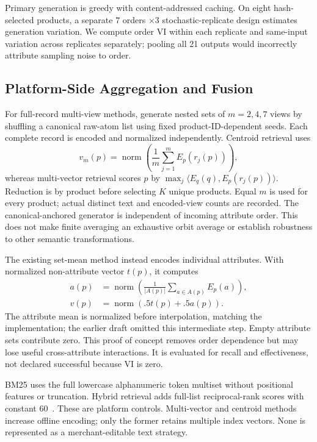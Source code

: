 Primary generation is greedy with content-addressed caching. On eight hash-selected products, a separate $7$ orders $\times 3$ stochastic-replicate design estimates generation variation. We compute order VI within each replicate and same-input variation across replicates separately; pooling all 21 outputs would incorrectly attribute sampling noise to order.

\subsection{Platform-Side Aggregation and Fusion}
For full-record multi-view methods, generate nested sets of $m=2,4,7$ views by shuffling a canonical raw-atom list using fixed product-ID-dependent seeds. Each complete record is encoded and normalized independently. Centroid retrieval uses
\begin{equation}
v_m(p)=\operatorname{norm}\left(\frac1m\sum_{j=1}^{m}E_p(r_j(p))\right),
\end{equation}
whereas multi-vector retrieval scores $p$ by $\max_j\langle E_q(q),E_p(r_j(p))\rangle$. Reduction is by product before selecting $K$ unique products. Equal $m$ is used for every product; actual distinct text and encoded-view counts are recorded. The canonical-anchored generator is independent of incoming attribute order. This does not make finite averaging an exhaustive orbit average or establish robustness to other semantic transformations.

The existing set-mean method instead encodes individual attributes. With normalized non-attribute vector $t(p)$, it computes
\begin{equation}
\begin{aligned}
a(p)&=\operatorname{norm}\left(\frac1{|A(p)|}\sum_{a\in A(p)}E_p(a)\right),\\
v(p)&=\operatorname{norm}(.5t(p)+.5a(p)).
\end{aligned}
\end{equation}
The attribute mean is normalized before interpolation, matching the implementation; the earlier draft omitted this intermediate step. Empty attribute sets contribute zero. This proof of concept removes order dependence but may lose useful cross-attribute interactions. It is evaluated for recall and effectiveness, not declared successful because VI is zero.

BM25 uses the full lowercase alphanumeric token multiset without positional features or truncation. Hybrid retrieval adds full-list reciprocal-rank scores with constant 60~\cite{cormack2009rrf}. These are platform controls. Multi-vector and centroid methods increase offline encoding; only the former retains multiple index vectors. None is represented as a merchant-editable text strategy.
